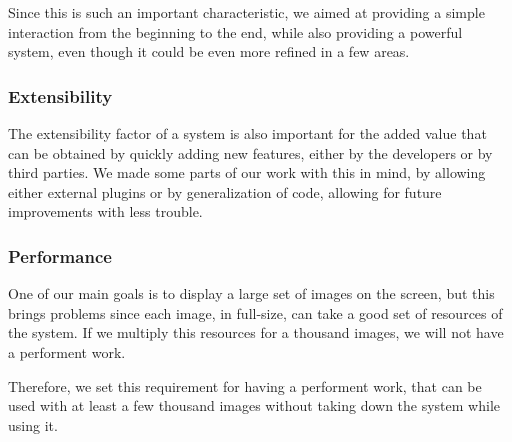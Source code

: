 Since this is such an important characteristic, we aimed at providing a simple interaction from the beginning to the end, while also providing a powerful system, even though it could be even more refined in a few areas.




\subsubsection{Extensibility} %
\label{ssub:Extensibility}

The extensibility factor of a system is also important for the added value that can be obtained by quickly adding new features, either by the developers or by third parties. We made some parts of our work with this in mind, by allowing either external plugins or by generalization of code, allowing for future improvements with less trouble.




\subsubsection{Performance} %
\label{ssub:Performance}

One of our main goals is to display a large set of images on the screen, but this brings problems since each image, in full-size, can take a good set of resources of the system. If we multiply this resources for a thousand images, we will not have a performent work.

Therefore, we set this requirement for having a performent work, that can be used with at least a few thousand images without taking down the system while using it.






